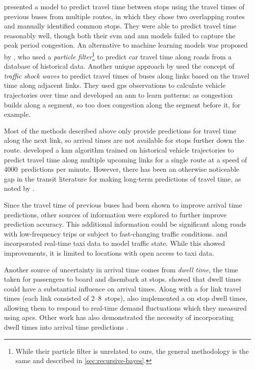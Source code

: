  presented a model to predict travel time between stops using the travel times of previous buses from multiple routes, in which they chose two overlapping routes and manually identified common stops. They were able to predict travel time reasonably well, though both their \gls{svm} and \gls{ann} models failed to capture the peak period congestion. An alternative to machine learning models was proposed by \citet{Chen_2014}, who used a \emph{particle filter}\footnote{While their particle filter is unrelated to ours, the general methodology is the same and described in \cref{sec:recursive-bayes}.} to predict car travel time along roads from a database of historical data. Another unique approach by \citet{Julio_2016} used the concept of \emph{traffic shock waves} to predict travel times of buses along links based on the travel time along adjacent links. They used \gls{gps} observations to calculate vehicle trajectories over time and developed an \gls{ann} to learn patterns: as congestion builds along a segment, so too does congestion along the segment before it, for example.


Most of the methods described above only provide predictions for travel time along the next link, so arrival times are not available for stops further down the route.  developed a \gls{knn} algorithm trained on historical vehicle trajectories to predict travel time along multiple upcoming links for a single route at a speed of 4000~predictions per minute. However, there has been an otherwise noticeable gap in the transit literature for making long-term predictions of travel time, as noted by \citet{Moreira_2015}.


Since the travel time of previous buses had been shown to improve arrival time predictions, other sources of information were explored to further improve prediction accuracy. This additional information could be significant along roads with low-frequency trips or subject to fast-changing traffic conditions.  and \citet{Ma_2019} incorporated real-time taxi data to model traffic state. While this showed improvements, it is limited to locations with open access to taxi data.


Another source of uncertainty in arrival time comes from \emph{dwell time}, the time taken for passengers to board and disembark at stops.  showed that dwell times could have a substantial influence on arrival times. Along with a \kf{} for link travel times (each link consisted of 2--8~stops), \citeauthor{Shalaby_2004} also implemented a \kf{} on stop dwell times, allowing them to respond to real-time demand fluctuations which they measured using \glspl{apc}. Other work has also demonstrated the necessity of incorporating dwell times into arrival time predictions \citep{Jeong_2005,Cats_2015,Cats_2016}.


